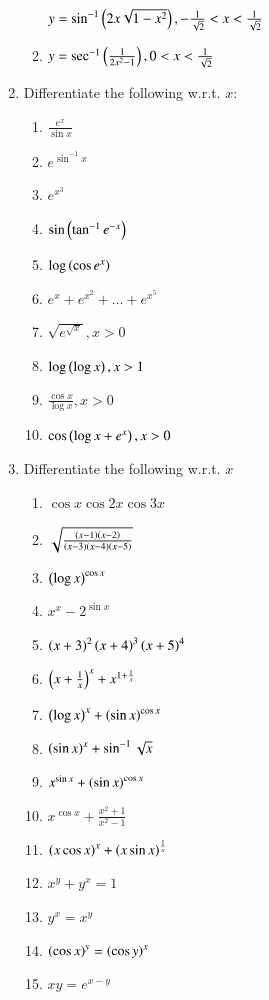 \begin{enumerate}[label=\arabic*.,ref=\thesubsection.\theenumi]
\begin{enumerate}
$
y = \sin^{-1}\left(2x\sqrt{1-x^2}\right), -\frac{1}{\sqrt{2}} < x < \frac{1}{\sqrt{2}}
$
\item 
$
y = \sec^{-1}\left(\frac{1}{2x^2-1}\right), 0 < x < \frac{1}{\sqrt{2}}
$
\end{enumerate}
\item Differentiate the following w.r.t. $x$:
\begin{enumerate}
\item 
$
\frac{e^x}{\sin x}
$
\item 
$
e^{\sin ^{-1} x}
$
\item 
$
e^{x^3}
$
\item 
$
\sin \left(\tan ^{-1}e^{-x}\right)
$
\item 
$
\log\left(\cos e^x\right)
$
\item 
$
e^x + e^{x^2}+\dots+e^{x^5}
$
\item 
$
\sqrt{e^{\sqrt{x}}}, x > 0
$
\item 
$
\log\left(\log x\right), x > 1
$
\item 
$
\frac{\cos x}{\log x}, x > 0
$
\item 
$
\cos \left(\log x + e^x\right), x > 0
$
\end{enumerate}
\item Differentiate the following w.r.t. $x$
\begin{enumerate}
\item 
$
\cos x \cos 2x \cos 3x
$
\item 
$
\sqrt{\frac{\left(x-1\right)\left(x-2\right)}{\left(x-3\right)\left(x-4\right)\left(x-5\right)}}
$
\item 
$
\left(\log x\right)^{\cos x}
$
\item 
$
x^x - 2^{\sin x}
$
\item 
$
\left(x+3\right)^2\left(x+4\right)^3\left(x+5\right)^4
$
\item 
$
\left(x + \frac{1}{x}\right)^x+x^{1+\frac{1}{x}}
$
\item 
$
\left(\log x\right)^x + \left(\sin x\right)^{\cos x}
$
\item 
$
\left(\sin x\right)^x +\sin^{-1}\sqrt{x}
$
\item 
$
x^{\sin x} + \left(\sin x\right)^{\cos x}
$
\item 
$
x^{\cos x} + \frac{x^2+1}{x^2-1}
$
\item 
$
\left(x \cos x\right)^x + \left(x \sin x\right)^{\frac{1}{x}}
$
\item 
$
x^{y}+y^x = 1
$
\item 
$
y^x = x^y
$
\item 
$
\left(\cos x\right)^y = \left(\cos y\right)^{x}
$
\item
$
xy = e^{x-y}
$
\end{enumerate}

\end{enumerate}
